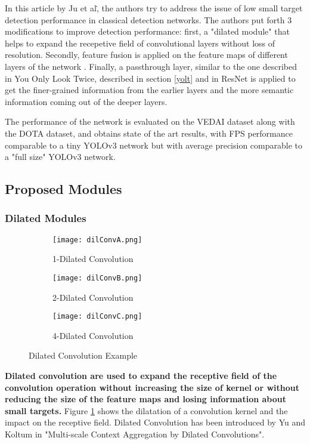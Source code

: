 
In this article by Ju et al\., the authors try to address the issue of low small target detection performance in classical detection networks. The authors put forth 3 modifications to improve detection performance: first, a "dilated module" that helps to expand the recepetive field of convolutional layers without loss of resolution. Secondly, feature fusion is applied on the feature maps of different layers of the network . Finally, a passthrough layer, similar to the one described in You Only Look Twice\cite{yolt}, described in section \ref{yolt} and in ResNet\cite{resNet} is applied to get the finer-grained information from the earlier layers and the more semantic information coming out of the deeper layers.

The performance of the network is evaluated on the VEDAI\cite{vedai} dataset along with the DOTA\cite{dota} dataset, and obtains state of the art results, with FPS performance comparable to a tiny YOLOv3 network\cite{yolov3} but with average precision comparable to a "full size" YOLOv3 network.
\subsection{Proposed Modules}
\subsubsection{Dilated Modules}

\begin{figure}[h!]
\begin{subfigure}{.3\textwidth}
  \centering
  \texttt{[image: dilConvA.png]}  
  \caption{1-Dilated Convolution}
\end{subfigure}
\begin{subfigure}{.3\textwidth}
  \centering
  \texttt{[image: dilConvB.png]}  
  \caption{2-Dilated Convolution}
\end{subfigure}
\begin{subfigure}{.3\textwidth}
  \centering
  \texttt{[image: dilConvC.png]}  
  \caption{4-Dilated Convolution}
\end{subfigure}
\caption{Dilated Convolution Example}
\label{fig:dilKernel}
\end{figure}

\textbf{Dilated convolution are used to expand the receptive field of the convolution operation without increasing the size of kernel or without reducing the size of the feature maps and losing information about small targets.} Figure \ref{fig:dilKernel} shows the dilatation of a convolution kernel and the impact on the receptive field. Dilated Convolution has been introduced by Yu and Koltum in "Multi-scale Context Aggregation by Dilated Convolutions"\cite{yu2015}.

